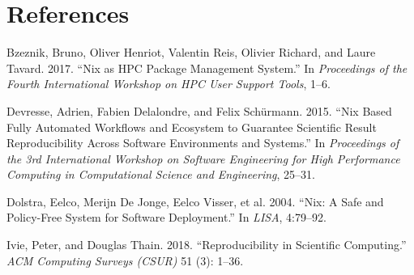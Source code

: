\documentclass[
]{article}
\newlength{\cslhangindent}
\newlength{\cslentryspacingunit} %
\newenvironment{CSLReferences}[2] %
 {%
  \setlength{\parindent}{0pt}
  \ifodd #1
  \let\oldpar\par
  \def\par{\hangindent=\cslhangindent\oldpar}
  \fi
  \setlength{\parskip}{#2\cslentryspacingunit}
 }%
 {}
\begin{document}
\hypertarget{references}{%
\section*{References}\label{references}}

\hypertarget{refs}{}
\begin{CSLReferences}{1}{0}
\leavevmode{}%
Bzeznik, Bruno, Oliver Henriot, Valentin Reis, Olivier Richard, and Laure Tavard. 2017. {``Nix as HPC Package Management System.''} In \emph{Proceedings of the Fourth International Workshop on HPC User Support Tools}, 1--6.

\leavevmode{}%
Devresse, Adrien, Fabien Delalondre, and Felix Schürmann. 2015. {``Nix Based Fully Automated Workflows and Ecosystem to Guarantee Scientific Result Reproducibility Across Software Environments and Systems.''} In \emph{Proceedings of the 3rd International Workshop on Software Engineering for High Performance Computing in Computational Science and Engineering}, 25--31.

\leavevmode{}%
Dolstra, Eelco, Merijn De Jonge, Eelco Visser, et al. 2004. {``Nix: A Safe and Policy-Free System for Software Deployment.''} In \emph{LISA}, 4:79--92.

\leavevmode{}%
Ivie, Peter, and Douglas Thain. 2018. {``Reproducibility in Scientific Computing.''} \emph{ACM Computing Surveys (CSUR)} 51 (3): 1--36.

\end{CSLReferences}
\end{document}
